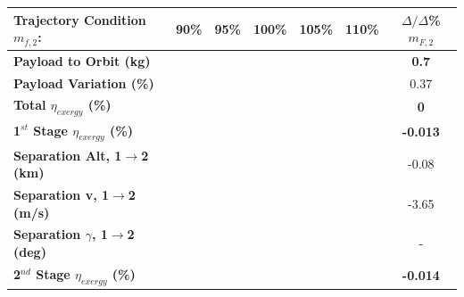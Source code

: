 \begin{table}[!ht]
\begin{tabular}{l c c c c c c} 
	\hline \textbf{Trajectory Condition}   \qquad  $m_{f,2}$:
	&90\%
	&95\%
	&100\%
	&105\%
	&110\%
	& $\Delta/\Delta$\%$m_{F,2}$
	\\
	\hline \textbf{Payload to Orbit (kg)}
	& \textbf{\PayloadToOrbitmFuelNinetyNoReturn}
	& \textbf{\PayloadToOrbitmFuelNinetyFiveNoReturn}
	& \textbf{\PayloadToOrbitmFuelStandardNoReturn}
	& \textbf{\PayloadToOrbitmFuelOneHundredFiveNoReturn}
	& \textbf{\PayloadToOrbitmFuelOneHundredTenNoReturn}
	&\textbf{0.7}
	\\
	\textbf{Payload Variation (\%)}
	& \PayloadVarmFuelNinetyNoReturn
	& \PayloadVarmFuelNinetyFiveNoReturn
	& \PayloadVarmFuelStandardNoReturn
	& \PayloadVarmFuelOneHundredFiveNoReturn
	& \PayloadVarmFuelOneHundredTenNoReturn
	&0.37
	\\
	\textbf{Total $\eta_{exergy}$ (\%)}
	& \textbf{\totalExergyEffmFuelNinetyNoReturn}
	& \textbf{\totalExergyEffmFuelNinetyFiveNoReturn}
	& \textbf{\totalExergyEffmFuelStandardNoReturn}
	& \textbf{\totalExergyEffmFuelOneHundredFiveNoReturn}
	& \textbf{\totalExergyEffmFuelOneHundredTenNoReturn}
	& \textbf{0}
	\\
	\hline 
	\textbf{1$^{st}$ Stage $\eta_{exergy}$ (\%)}
	& \textbf{\firstExergyEffmFuelNinetyNoReturn}
	& \textbf{\firstExergyEffmFuelNinetyFiveNoReturn}
	& \textbf{\firstExergyEffmFuelStandardNoReturn}
	& \textbf{\firstExergyEffmFuelOneHundredFiveNoReturn}
	& \textbf{\firstExergyEffmFuelOneHundredTenNoReturn}
	& \textbf{-0.013}
	\\

	\textbf{Separation Alt, 1$\rightarrow$2 (km)}
	& \firstsecondSeparationAltmFuelNinetyNoReturn
	& \firstsecondSeparationAltmFuelNinetyFiveNoReturn
	& \firstsecondSeparationAltmFuelStandardNoReturn
	& \firstsecondSeparationAltmFuelOneHundredFiveNoReturn
	& \firstsecondSeparationAltmFuelOneHundredTenNoReturn
	&-0.08
	\\
	\textbf{Separation v, 1$\rightarrow$2 (m/s)}
	& \firstsecondSeparationvmFuelNinetyNoReturn
	& \firstsecondSeparationvmFuelNinetyFiveNoReturn
	& \firstsecondSeparationvmFuelStandardNoReturn
	& \firstsecondSeparationvmFuelOneHundredFiveNoReturn
	& \firstsecondSeparationvmFuelOneHundredTenNoReturn
	&-3.65
	\\
	\textbf{Separation $\gamma$, 1$\rightarrow$2 (deg)}
	& \firstsecondSeparationgammamFuelNinetyNoReturn
	& \firstsecondSeparationgammamFuelNinetyFiveNoReturn
	& \firstsecondSeparationgammamFuelStandardNoReturn
	& \firstsecondSeparationgammamFuelOneHundredFiveNoReturn
	& \firstsecondSeparationgammamFuelOneHundredTenNoReturn
	& -
	\\
	\hline 
	\textbf{2$^{nd}$ Stage $\eta_{exergy}$ (\%)}
	& \textbf{\secondExergyEffmFuelNinetyNoReturn}
	& \textbf{\secondExergyEffmFuelNinetyFiveNoReturn}
	& \textbf{\secondExergyEffmFuelStandardNoReturn}
	& \textbf{\secondExergyEffmFuelOneHundredFiveNoReturn}
	& \textbf{\secondExergyEffmFuelOneHundredTenNoReturn}
	& \textbf{-0.014}
	\\


\end{tabular}
\end{table}
